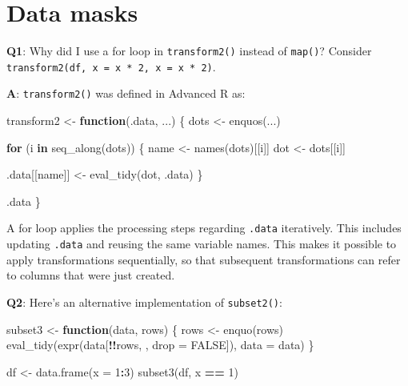 \documentclass[
]{krantz}
\makeatletter
\newenvironment{Shaded}{\begin{snugshade}}{\end{snugshade}}
\newcommand{\ControlFlowTok}[1]{\textcolor[rgb]{0.13,0.29,0.53}{\textbf{#1}}}
\newcommand{\DataTypeTok}[1]{\textcolor[rgb]{0.13,0.29,0.53}{#1}}
\newcommand{\DecValTok}[1]{\textcolor[rgb]{0.00,0.00,0.81}{#1}}
\newcommand{\KeywordTok}[1]{\textcolor[rgb]{0.13,0.29,0.53}{\textbf{#1}}}
\newcommand{\NormalTok}[1]{#1}
\newcommand{\OperatorTok}[1]{\textcolor[rgb]{0.81,0.36,0.00}{\textbf{#1}}}
\newcommand{\OtherTok}[1]{\textcolor[rgb]{0.56,0.35,0.01}{#1}}
\newcommand{\StringTok}[1]{\textcolor[rgb]{0.31,0.60,0.02}{#1}}
\newenvironment{kframe}{%
\medskip{}
\setlength{\fboxsep}{.8em}
 \def\at@end@of@kframe{}%
 \ifinner\ifhmode%
  \def\at@end@of@kframe{\end{minipage}}%
  \begin{minipage}{\columnwidth}%
 \fi\fi%
 \def\FrameCommand##1{\hskip\@totalleftmargin \hskip-\fboxsep
 \colorbox{shadecolor}{##1}\hskip-\fboxsep
     \hskip-\linewidth \hskip-\@totalleftmargin \hskip\columnwidth}%
 \MakeFramed {\advance\hsize-\width
   \@totalleftmargin\z@ \linewidth\hsize
   \@setminipage}}%
 {\par\unskip\endMakeFramed%
 \at@end@of@kframe}
\renewenvironment{Shaded}{\begin{kframe}}{\end{kframe}}
\renewcommand{\KeywordTok} [1]{\textcolor[rgb]{0.00,0.44,0.13}{{#1}}}
\renewcommand{\DataTypeTok}[1]{\textcolor[rgb]{0.56,0.13,0.00}{{#1}}}
\renewcommand{\DecValTok}  [1]{\textcolor[rgb]{0.25,0.63,0.44}{{#1}}}
\renewcommand{\StringTok}  [1]{\textcolor[rgb]{0.25,0.44,0.63}{{#1}}}
\renewcommand{\OtherTok}   [1]{\textcolor[rgb]{0.00,0.44,0.13}{{#1}}}
\renewcommand{\NormalTok}  [1]{{#1}}
\makeatother
\begin{document}
\hypertarget{data-masks}{%
\section{Data masks}\label{data-masks}}

\textbf{{Q1}}: Why did I use a for loop in \texttt{transform2()} instead of \texttt{map()}? Consider \texttt{transform2(df,\ x\ =\ x\ *\ 2,\ x\ =\ x\ *\ 2)}.

\textbf{{A}}: \texttt{transform2()} was defined in Advanced R as:

\begin{Shaded}
\begin{Highlighting}[]
\NormalTok{transform2 <-}\StringTok{ }\ControlFlowTok{function}\NormalTok{(.data, ...) \{}
\NormalTok{  dots <-}\StringTok{ }\KeywordTok{enquos}\NormalTok{(...)}

  \ControlFlowTok{for}\NormalTok{ (i }\ControlFlowTok{in} \KeywordTok{seq_along}\NormalTok{(dots)) \{}
\NormalTok{    name <-}\StringTok{ }\KeywordTok{names}\NormalTok{(dots)[[i]]}
\NormalTok{    dot <-}\StringTok{ }\NormalTok{dots[[i]]}

\NormalTok{    .data[[name]] <-}\StringTok{ }\KeywordTok{eval_tidy}\NormalTok{(dot, .data)}
\NormalTok{  \}}

\NormalTok{  .data}
\NormalTok{\}}
\end{Highlighting}
\end{Shaded}

A for loop applies the processing steps regarding \texttt{.data} iteratively. This includes updating \texttt{.data} and reusing the same variable names. This makes it possible to apply transformations sequentially, so that subsequent transformations can refer to columns that were just created.

\textbf{{Q2}}: Here's an alternative implementation of \texttt{subset2()}:

\begin{Shaded}
\begin{Highlighting}[]
\NormalTok{subset3 <-}\StringTok{ }\ControlFlowTok{function}\NormalTok{(data, rows) \{}
\NormalTok{  rows <-}\StringTok{ }\KeywordTok{enquo}\NormalTok{(rows)}
  \KeywordTok{eval_tidy}\NormalTok{(}\KeywordTok{expr}\NormalTok{(data[}\OperatorTok{!!}\NormalTok{rows, , }\DataTypeTok{drop =} \OtherTok{FALSE}\NormalTok{]), }\DataTypeTok{data =}\NormalTok{ data)}
\NormalTok{\}}

\NormalTok{df <-}\StringTok{ }\KeywordTok{data.frame}\NormalTok{(}\DataTypeTok{x =} \DecValTok{1}\OperatorTok{:}\DecValTok{3}\NormalTok{)}
\KeywordTok{subset3}\NormalTok{(df, x }\OperatorTok{==}\StringTok{ }\DecValTok{1}\NormalTok{)}
\end{Highlighting}
\end{Shaded}
\end{document}
